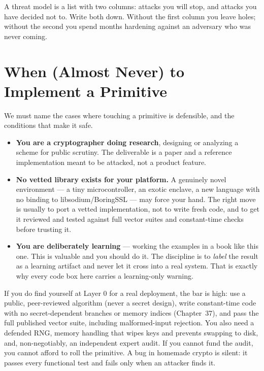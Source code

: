 \begin{intuitionbox}
A threat model is a list with two columns: attacks you will stop, and attacks
you have decided not to. Write both down. Without the first column you leave
holes; without the second you spend months hardening against an adversary who
was never coming.
\end{intuitionbox}

\section{When (Almost Never) to Implement a Primitive}
\label{ch39:when-roll}

We must name the cases where touching a primitive is defensible, and the
conditions that make it safe.

\begin{itemize}
  \item \textbf{You are a cryptographer doing research}, designing or analyzing a
  scheme for public scrutiny. The deliverable is a paper and a reference
  implementation meant to be attacked, not a product feature.
  \item \textbf{No vetted library exists for your platform.} A genuinely novel
  environment --- a tiny microcontroller, an exotic enclave, a new language with no
  binding to libsodium/BoringSSL --- may force your hand. The right move is usually
  to port a vetted implementation, not to write fresh code, and to get it reviewed
  and tested against full vector suites and constant-time checks before trusting it.
  \item \textbf{You are deliberately learning} --- working the examples in a book
  like this one. This is valuable and you should do it. The discipline is to
  \emph{label} the result as a learning artifact and never let it cross into a real
  system. That is exactly why every code box here carries a learning-only warning.
\end{itemize}

If you do find yourself at Layer 0 for a real deployment, the bar is high: use a
public, peer-reviewed algorithm (never a secret design), write constant-time code with
no secret-dependent branches or memory indices (Chapter~37), and pass the full
published vector suite, including malformed-input rejection. You also need a defended
RNG, memory handling that wipes keys and prevents swapping to disk, and,
non-negotiably, an independent expert audit. If you cannot fund the audit, you
cannot afford to roll the primitive. A bug in homemade crypto is silent: it
passes every functional test and fails only when an attacker finds it.

